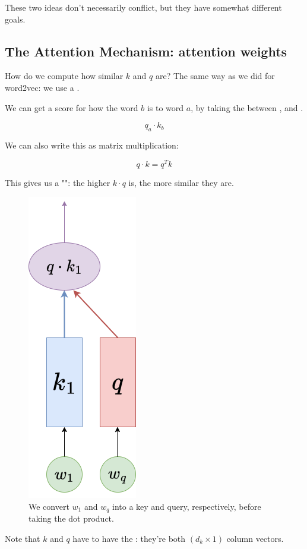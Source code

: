         These two ideas don't necessarily conflict, but they have somewhat different goals.

    \phantom{}

    \subsection{The Attention Mechanism: attention weights}

        How do we compute how similar $k$ and $q$ are? The same way as we did for word2vec: we use a .\\

        \begin{kequation}
            We can get a score for how  the word $b$ is to word $a$, by taking the  between , and .

            \begin{equation*}
                q_a \cdot k_b  
            \end{equation*}

            We can also write this as matrix multiplication:

            \begin{equation*}
                q \cdot k = q^Tk
            \end{equation*}
        \end{kequation}

        This gives us a "": the higher $k \cdot q$ is, the more similar they are.

        \begin{figure}[H]
            \centering
            \includegraphics[width=0.1\linewidth]{images/transformers_images/k_dot_q.png}
            \caption*{We convert $w_1$ and $w_q$ into a key and query, respectively, before taking the dot product.}
        \end{figure}

        \begin{notation}
            Note that $k$ and $q$ have to have the : they're both $(d_k \times 1)$ column vectors.
        \end{notation}

